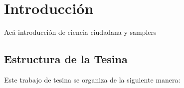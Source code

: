 \chapter{Introducción}

\label{introduccion}


Acá introducción de ciencia ciudadana y samplers

\section{ Estructura de la Tesina }
Este trabajo de tesina se organiza de la siguiente manera:
